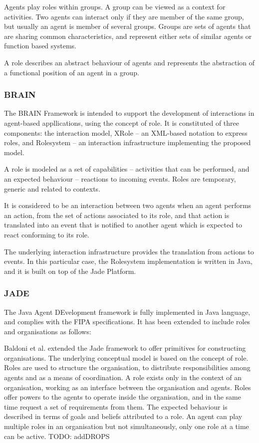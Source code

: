 \documentclass{article}
\begin{document}
Agents play roles within groups. A group can be viewed as a context
for activities. Two agents can interact only if they are member of
the same group, but usually an agent is member of several groups.
Groups are sets of agents that are sharing common characteristics, and
represent either sets of similar agents or function based systems.

A role describes an abstract behaviour of agents and represents the
abstraction of a functional position of an agent in a group.

\subsubsection{BRAIN} The BRAIN Framework is intended to support
the development of interactions in agent-based appllications, using
the concept of role. It is constituted of three components: the
interaction model, XRole -- an XML-based notation to express roles,
and Rolesystem -- an interaction infrastructure implementing the
proposed model.

A role is modeled as a set of capabilities -- activities that can be
performed, and an expected behaviour -- reactions to incoming events.
Roles are temporary, generic and related to contexts.

It is considered to be an interaction between two agents when an
agent performs an action, from the set of actions associated to its
role, and that action is translated into an event that is notified to
another agent which is expected to react conforming to its role.

The underlying interaction infrastructure provides the translation
from actions to events. In this particular case, the Rolesystem
implementation is written in Java, and it is built on top of the Jade
Platform.

\subsubsection{JADE} The Java Agent DEvelopment framework is
fully implemented in Java language, and complies with the FIPA
specifications. It has been extended to include roles and
organisations as follows:

Baldoni et al. extended the Jade framework to offer primitives
for constructing organisations. The underlying conceptual model
is based on the concept of role. Roles are used to structure the
organisation, to distribute responsibilities among agents and as
a means of coordination. A role exists only in the context of an
organisation, working as an interface between the organisation and
agents. Roles offer powers to the agents to operate inside the
organisation, and in the same time request a set of requirements
from them. The expected behaviour is described in terms of goals and
beliefs attributed to a role. An agent can play multiple roles in an
organisation but not simultaneously, only one role at a time can be
active. TODO: addDROPS
\end{document}
